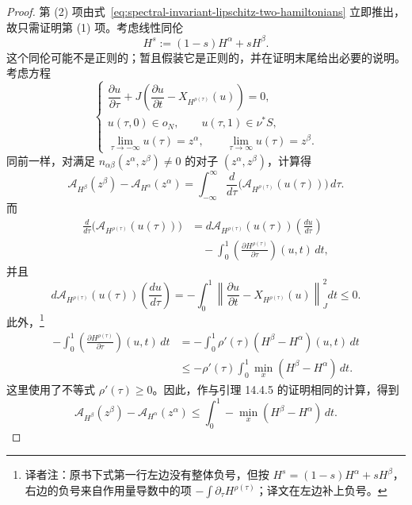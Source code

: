 \begin{proof}
第 (2) 项由式~\eqref{eq:spectral-invariant-lipschitz-two-hamiltonians} 立即推出，故只需证明第 (1) 项。考虑线性同伦
\[
  H^s:=(1-s)H^\alpha+sH^\beta.
\]
这个同伦可能不是\personFloer{}正则的；暂且假装它是正则的，并在证明末尾给出必要的说明。考虑方程
\[
  \begin{cases}
    \dfrac{\partial u}{\partial\tau}
    +J\left(
      \dfrac{\partial u}{\partial t}-X_{H^{\rho(\tau)}}(u)
    \right)=0,\\[6pt]
    u(\tau,0)\in o_N,
    \qquad u(\tau,1)\in\nu^*S,\\[4pt]
    \displaystyle\lim_{\tau\to-\infty}u(\tau)=z^\alpha,
    \qquad
    \displaystyle\lim_{\tau\to\infty}u(\tau)=z^\beta.
  \end{cases}
\]
同前一样，对满足 $n_{\alpha\beta}(z^\alpha,z^\beta)\ne0$ 的对子 $(z^\alpha,z^\beta)$，计算得
\[
  \mathcal A_{H^\beta}(z^\beta)-\mathcal A_{H^\alpha}(z^\alpha)
  =\int_{-\infty}^{\infty}
    \frac d{d\tau}
    \bigl(\mathcal A_{H^{\rho(\tau)}}(u(\tau))\bigr)\,d\tau.
\]
而
\[
\begin{split}
  \frac d{d\tau}
  \bigl(\mathcal A_{H^{\rho(\tau)}}(u(\tau))\bigr)
  &=d\mathcal A_{H^{\rho(\tau)}}(u(\tau))
    \left(\frac{du}{d\tau}\right)\\
  &\quad-
    \int_0^1
    \left(\frac{\partial H^{\rho(\tau)}}{\partial\tau}\right)(u,t)\,dt,
\end{split}
\]
并且
\[
  d\mathcal A_{H^{\rho(\tau)}}(u(\tau))
  \left(\frac{du}{d\tau}\right)
  =-\int_0^1
    \left\lVert
      \frac{\partial u}{\partial t}-X_{H^{\rho(\tau)}}(u)
    \right\rVert_J^2dt
  \le0.
\]
此外，\footnote{译者注：原书下式第一行左边没有整体负号，但按 $H^s=(1-s)H^\alpha+sH^\beta$，右边的负号来自作用量导数中的项 $-\int\partial_\tau H^{\rho(\tau)}$；译文在左边补上负号。}
\begin{equation}
\begin{split}
  -\int_0^1
  \left(\frac{\partial H^{\rho(\tau)}}{\partial\tau}\right)(u,t)\,dt
  &=-\int_0^1\rho'(\tau)(H^\beta-H^\alpha)(u,t)\,dt\\
  &\le-\rho'(\tau)
    \int_0^1\min_x(H^\beta-H^\alpha)\,dt.
\end{split}
\label{eq:hamiltonian-homotopy-action-derivative}
\end{equation}
这里使用了不等式 $\rho'(\tau)\ge0$。因此，作与引理 14.4.5 的证明相同的计算，得到
\[
  \mathcal A_{H^\beta}(z^\beta)-\mathcal A_{H^\alpha}(z^\alpha)
  \le\int_0^1-\min_x(H^\beta-H^\alpha)\,dt.
\]


\end{proof}

